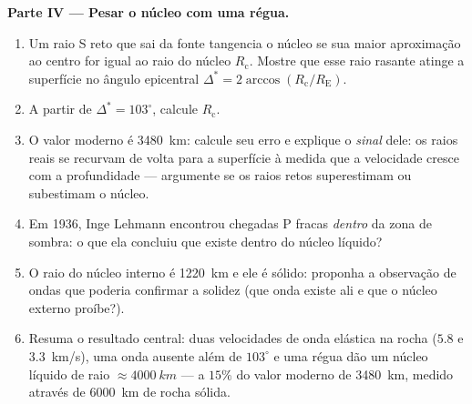 \begin{problem}
\medskip\noindent\textbf{Parte IV --- Pesar o núcleo com uma régua.}
\begin{enumerate}[resume]
  \item Um raio S reto que sai da fonte tangencia o núcleo se sua
        maior aproximação ao centro for igual ao raio do núcleo
        $R_{\text{c}}$. Mostre que esse raio rasante atinge a
        superfície no ângulo epicentral $\Delta^* =
        2\arccos(R_{\text{c}}/R_{\text{E}})$.
  \item A partir de $\Delta^* = 103^\circ$, calcule $R_{\text{c}}$.
  \item O valor moderno é \qty{3480}{km}: calcule seu erro e explique
        o \emph{sinal} dele: os raios reais se recurvam de volta para
        a superfície à medida que a velocidade cresce com a
        profundidade --- argumente se os raios retos superestimam ou
        subestimam o núcleo.
  \item Em 1936, Inge Lehmann encontrou chegadas P fracas
        \emph{dentro} da zona de sombra: o que ela concluiu que existe
        dentro do núcleo líquido?
  \item O raio do núcleo interno é \qty{1220}{km} e ele é sólido:
        proponha a observação de ondas que poderia confirmar a solidez
        (que onda existe ali e que o núcleo externo proíbe?).
  \item Resuma o resultado central: duas velocidades de onda elástica
        na rocha ($5.8$ e \qty{3.3}{km/s}), uma onda ausente além de
        $103^\circ$ e uma régua dão um núcleo líquido de raio
        $\approx \qty{4000}{km}$ --- a $15\%$ do valor moderno de
        \qty{3480}{km}, medido através de \qty{6000}{km} de rocha
        sólida.
\end{enumerate}
\end{problem}
